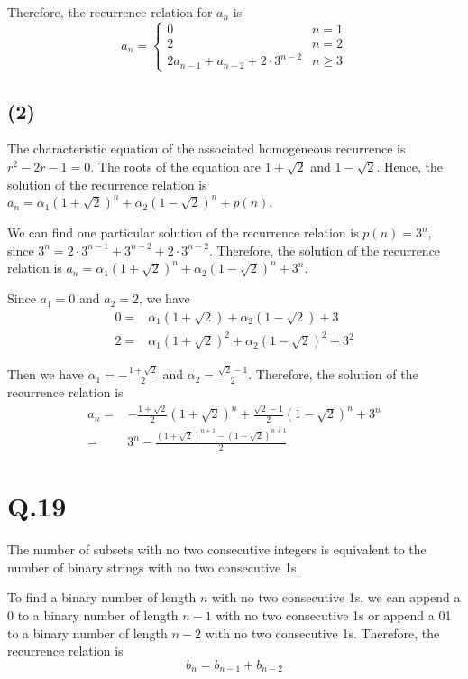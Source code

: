 \documentclass[a4paper,12pt]{article}
\begin{document}
Therefore, the recurrence relation for $a_n$ is
\begin{equation*}
	a_n = 
	\begin{cases}
		0 & n = 1 \\
		2 & n = 2 \\
		2a_{n-1} + a_{n-2} + 2 \cdot 3^{n-2} & n \geq 3
	\end{cases}
\end{equation*}

\subsection*{(2)}

The characteristic equation of the associated homogeneous recurrence is $r^2 - 2r - 1 = 0$.
The roots of the equation are $1 + \sqrt{2}$ and $1 - \sqrt{2}$.
Hence, the solution of the recurrence relation is $a_n = \alpha_1 (1 + \sqrt{2})^n + \alpha_2 (1 - \sqrt{2})^n + p(n)$.

We can find one particular solution of the recurrence relation is $p(n) = 3^n$, since $3^n = 2 \cdot 3^{n-1} + 3^{n-2} + 2 \cdot 3^{n-2}$.
Therefore, the solution of the recurrence relation is $a_n = \alpha_1 (1 + \sqrt{2})^n + \alpha_2 (1 - \sqrt{2})^n + 3^n$.

Since $a_1 = 0$ and $a_2 = 2$, we have
\begin{align*}
	0 =& \alpha_1 (1 + \sqrt{2}) + \alpha_2 (1 - \sqrt{2}) + 3 \\
	2 =& \alpha_1 (1 + \sqrt{2})^2 + \alpha_2 (1 - \sqrt{2})^2 + 3^2
\end{align*}

Then we have $\alpha_1 = - \frac{1 + \sqrt{2}}{2}$ and $\alpha_2 = \frac{\sqrt{2} - 1}{2}$.
Therefore, the solution of the recurrence relation is
\begin{align*}
	a_n =& - \frac{1 + \sqrt{2}}{2} (1 + \sqrt{2})^n + \frac{\sqrt{2} - 1}{2} (1 - \sqrt{2})^n + 3^n \\
	=& 3^n - \frac{(1 + \sqrt{2})^{n+1} - (1 - \sqrt{2})^{n+1}}{2}
\end{align*}

\section*{Q.19}

The number of subsets with no two consecutive integers is equivalent to the number of binary strings with no two consecutive 1s.

To find a binary number of length $n$ with no two consecutive 1s, we can append a 0 to a binary number of length $n - 1$ with no two consecutive 1s or append a 01 to a binary number of length $n - 2$ with no two consecutive 1s.
Therefore, the recurrence relation is
\begin{equation*}
	b_n = b_{n-1} + b_{n-2}
\end{equation*}
\end{document}
